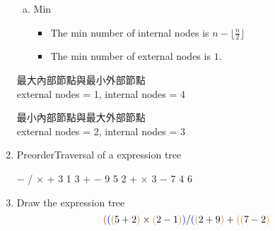 \documentclass[12pt,a4paper]{article}
\begin{document}
\begin{CJK*}{UTF8}{bsmi}
\begin{enumerate}[1.]
\begin{enumerate}[a.]
        \item Min
        \begin{itemize}
            \item The min number of internal nodes is $n-\lfloor \frac{n}{2} \rfloor$
            \item The min number of external nodes is $1$.
        \end{itemize}
    \end{enumerate}
    \begin{multicols}{2}
    \begin{center}
        最大內部節點與最小外部節點\\
        external nodes = 1, internal nodes = 4\\
    \end{center}
    \columnbreak
    \begin{center}
        最小內部節點與最大外部節點\\
        external nodes = 2, internal nodes = 3\\
        \vspace{4em}
    \end{center}
    \end{multicols}
    \item PreorderTraversal of a expression tree
    \begin{center}
        $-$ / $\times$ + 3 1 3 + $-$ 9 5 2 + $\times$ 3 $-$ 7 4 6
    \end{center}
    \item Draw the expression tree
    $$\color{red}(\color{blue}(\color{brown}(\color{black}5 + 2\color{brown})\color{black}
        \times\color{brown}(\color{black}2 - 1\color{brown})\color{blue})\color{black}
        /\color{blue}(\color{brown}(\color{black}2 + 9\color{brown})\color{black}
         + \color{brown}(\color{orange}(\color{black}7 - 2\color{orange})\color{black}
$$
\end{enumerate}
\end{CJK*}
\end{document}
